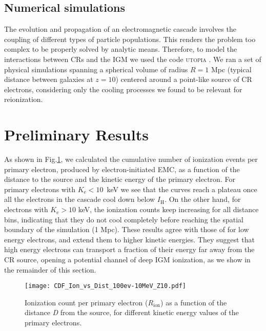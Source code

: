 \documentclass[baaa]{baaa}
\begin{document}
\subsection{Numerical simulations}

The evolution and propagation of an electromagnetic cascade involves the coupling of different types of particle populations. This renders the problem too complex to be properly solved by analytic means. Therefore, to model the interactions between CRs and the IGM we used the code \textsc{utopia} \citep[Understanding Transport Of Particles In Astrophysics;][]{Pellizza2010, Douna}. We ran a set of physical simulations spanning a spherical volume of radius $R = 1$ Mpc (typical distance between galaxies at $z= 10$)  centered around a point-like source of CR electrons, considering only the cooling processes we found to be relevant for reionization. 




\section{Preliminary Results}

As shown in  Fig.\ref{CDF}, we calculated the cumulative number of ionization events per primary electron, produced by electron-initiated EMC, as a function of the distance to the source and the kinetic energy of the primary electron. For primary electrons with $K_{\mathrm{e}} < 10$~keV we see that the curves reach a plateau once all the electrons in the cascade cool down below $I_{\mathrm{H}}$. On the other hand, for electrons with $K_{\mathrm{e}} > 10$ keV, the ionization counts keep increasing for all distance bins, indicating that they do not cool completely before reaching the spatial boundary of the simulation (1 Mpc). These results agree with those of \citet{Douna} for low energy electrons, and extend them to higher kinetic energies. They suggest that high energy electrons can transport a fraction of their energy far away from the CR source, opening a potential channel of deep IGM ionization, as we show in the remainder of this section. 


\begin{figure}[!h]
\centering
\texttt{[image: CDF\_Ion\_vs\_Dist\_100ev-10MeV\_Z10.pdf]}
\caption{Ionization count per primary electron ($R_\mathrm{ion}$) as a function of the distance \textit{D} from the source, for different kinetic energy values of the primary electrons.}
\label{CDF}
\end{figure}
\end{document}
